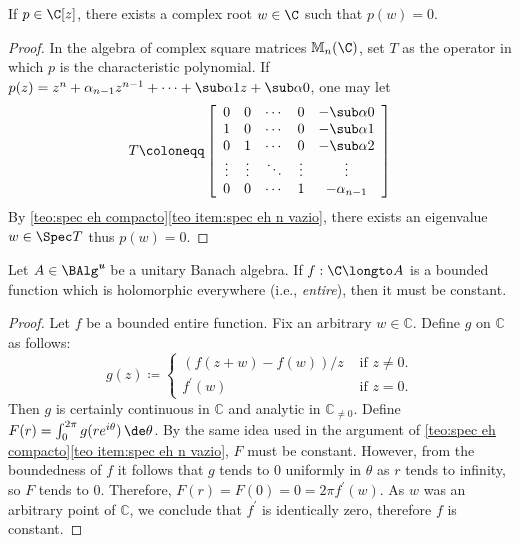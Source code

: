 \begin{corolario}
\label{teo: fund. teo. algebra}
If $p\in \C[z]$, there exists a complex root $w\in \C$ such that $p(w)=0$.
\end{corolario}
\begin{proof}
In the algebra of complex square matrices $\mathbb M_n(\C)$, set $T$ as the operator in which $p$ is the characteristic polynomial. If $p(z) = z^n + \alpha_{n-1}z^{n-1} + \cdots + \sub\alpha1z + \sub\alpha0$, one may let
$$
T \coloneqq 
\left[\begin{array}{ccccc}
0 & 0 & \cdots & 0 & -\sub\alpha{0} \\
1 & 0 & \cdots & 0 & -\sub\alpha{1} \\
0 & 1 & \cdots & 0 & -\sub\alpha{2} \\
\vdots & \vdots & \ddots & \vdots & \vdots \\
0 & 0 & \cdots & 1 & -\alpha_{n-1}
\end{array}\right]
$$
By \ref{teo:spec eh compacto}\ref{teo item:spec eh n vazio}, there exists an eigenvalue $w \in \Spec T$ thus $p(w)=0$.
\end{proof}

\begin{corolario}
Let $A\in \BAlg^{\textit{\textbf{u}}}$ be a unitary Banach algebra. If $f:\C \longto A$ is a bounded function which is holomorphic everywhere (i.e., \textit{entire}), then it must be constant.
\end{corolario}
\begin{proof}
Let $f$ be a bounded entire function. Fix an arbitrary $w\in \mathbb{C}$. Define $g$ on $\mathbb{C}$ as follows:
$$
g(z)\coloneqq \begin{cases}(f(z+w)-f(w)) / z & \text { if } z \neq 0. \\ f^{\prime}(w) & \text { if } z=0.
\end{cases}
$$
Then $g$ is certainly continuous in $\mathbb{C}$ and analytic in $\mathbb{C}_{\neq 0}$. Define $F(r)=\int_{0}^{2 \pi} g(r e^{i \theta})\,\de\theta
$. By the same idea used in the argument of \ref{teo:spec eh compacto}\ref{teo item:spec eh n vazio}, $F$ must be constant. However, from the boundedness of $f$ it follows that $g$ tends to 0 uniformly in $\theta$ as $r$ tends to infinity, so $F$ tends to 0. Therefore, $F(r)=F(0)=0=2 \pi f^{\prime}(w)$. As $w$ was an arbitrary point of $\mathbb{C}$, we conclude that $f^{\prime}$ is identically zero, therefore $f$ is constant.
\end{proof}

